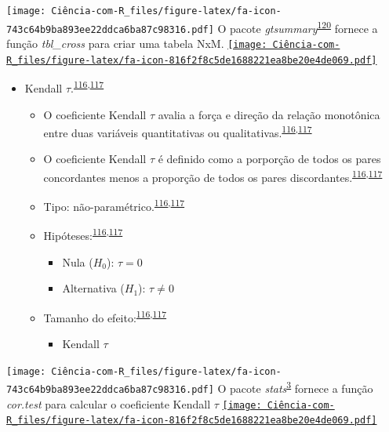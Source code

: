 \documentclass[
]{book}
\providecommand{\tightlist}{%
  \setlength{\itemsep}{0pt}\setlength{\parskip}{0pt}}
\begin{document}
\texttt{[image: Ciência-com-R\_files/figure-latex/fa-icon-743c64b9ba893ee22ddca6ba87c98316.pdf]} O pacote \emph{gtsummary}\textsuperscript{\protect\hyperlink{ref-gtsummary}{120}} fornece a função \emph{tbl\_cross} para criar uma tabela NxM. \href{https://cran.r-project.org/web/packages/gtsummary/index.html}{\texttt{[image: Ciência-com-R\_files/figure-latex/fa-icon-816f2f8c5de1688221ea8be20e4de069.pdf]}}

\begin{itemize}
\item
  Kendall \(\tau\).\textsuperscript{\protect\hyperlink{ref-khamis2008}{116},\protect\hyperlink{ref-allison2022}{117}}

  \begin{itemize}
  \item
    O coeficiente Kendall \(\tau\) avalia a força e direção da relação monotônica entre duas variáveis quantitativas ou qualitativas.\textsuperscript{\protect\hyperlink{ref-khamis2008}{116},\protect\hyperlink{ref-allison2022}{117}}
  \item
    O coeficiente Kendall \(\tau\) é definido como a porporção de todos os pares concordantes menos a proporção de todos os pares discordantes.\textsuperscript{\protect\hyperlink{ref-khamis2008}{116},\protect\hyperlink{ref-allison2022}{117}}
  \item
    Tipo: não-paramétrico.\textsuperscript{\protect\hyperlink{ref-khamis2008}{116},\protect\hyperlink{ref-allison2022}{117}}
  \item
    Hipóteses:\textsuperscript{\protect\hyperlink{ref-khamis2008}{116},\protect\hyperlink{ref-allison2022}{117}}

    \begin{itemize}
    \item
      Nula (\(H_{0}\)): \(\tau=0\)
    \item
      Alternativa (\(H_{1}\)): \(\tau≠0\)
    \end{itemize}
  \item
    Tamanho do efeito:\textsuperscript{\protect\hyperlink{ref-khamis2008}{116},\protect\hyperlink{ref-allison2022}{117}}

    \begin{itemize}
    \tightlist
    \item
      Kendall \(\tau\)
    \end{itemize}
  \end{itemize}
\end{itemize}

\texttt{[image: Ciência-com-R\_files/figure-latex/fa-icon-743c64b9ba893ee22ddca6ba87c98316.pdf]} O pacote \emph{stats}\textsuperscript{\protect\hyperlink{ref-stats-2}{3}} fornece a função \emph{cor.test} para calcular o coeficiente Kendall \(\tau\) \href{https://rdocumentation.org/packages/stats/versions/3.6.2}{\texttt{[image: Ciência-com-R\_files/figure-latex/fa-icon-816f2f8c5de1688221ea8be20e4de069.pdf]}}
\end{document}
